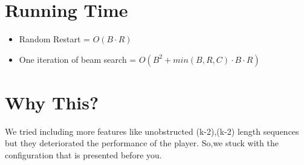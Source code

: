 \documentclass[10pt]{article}
\begin{document}
\section{Running Time}
\begin{itemize}
\item Random Restart = $O(B\cdot R)$
\item One iteration of beam search = $O(B^2 + min(B,R,C)\cdot B \cdot R)$
\end{itemize}
\section{Why This?}
We tried including more features like unobstructed (k-2),(k-2) length sequences but they deteriorated the performance of the player. So,we stuck with the configuration that is presented before you.
\end{document}

